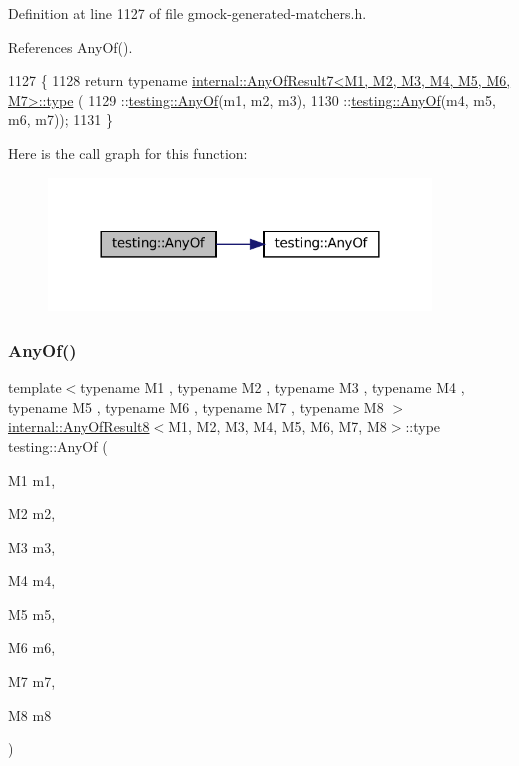Definition at line 1127 of file gmock-\/generated-\/matchers.\+h.



References Any\+Of().


\begin{DoxyCode}
1127                                                        \{
1128   \textcolor{keywordflow}{return} \textcolor{keyword}{typename} \hyperlink{namespacegenerate__debs_a50bc9a7ecac9584553e089a448bcde58}{internal::AnyOfResult7<M1, M2, M3, M4, M5, M6, M7>::type}
      (
1129       ::\hyperlink{namespacetesting_a81cfefd9f75cdce827d5bc873cf73aac}{testing::AnyOf}(m1, m2, m3),
1130       ::\hyperlink{namespacetesting_a81cfefd9f75cdce827d5bc873cf73aac}{testing::AnyOf}(m4, m5, m6, m7));
1131 \}
\end{DoxyCode}
Here is the call graph for this function\+:
\nopagebreak
\begin{figure}[H]
\begin{center}
\leavevmode
\includegraphics[width=288pt]{namespacetesting_a754d1bddb237e79613f6834af3329efa_cgraph}
\end{center}
\end{figure}
\mbox{\label{namespacetesting_a9c979c62cc004664b14e0ce444e531d5}} 
\subsubsection{\texorpdfstring{Any\+Of()}{AnyOf()}\hspace{0.1cm}{\footnotesize\ttfamily [7/9]}}
{\footnotesize\ttfamily template$<$typename M1 , typename M2 , typename M3 , typename M4 , typename M5 , typename M6 , typename M7 , typename M8 $>$ \\
\hyperlink{structtesting_1_1internal_1_1AnyOfResult8}{internal\+::\+Any\+Of\+Result8}$<$M1, M2, M3, M4, M5, M6, M7, M8$>$\+::type testing\+::\+Any\+Of (\begin{DoxyParamCaption}\item[{M1}]{m1,  }\item[{M2}]{m2,  }\item[{M3}]{m3,  }\item[{M4}]{m4,  }\item[{M5}]{m5,  }\item[{M6}]{m6,  }\item[{M7}]{m7,  }\item[{M8}]{m8 }\end{DoxyParamCaption})\hspace{0.3cm}{\ttfamily [inline]}}



